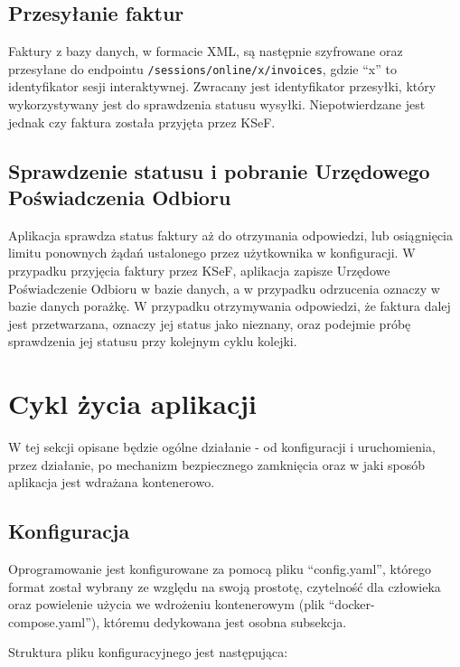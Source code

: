 \subsection{Przesyłanie faktur}
Faktury z bazy danych, w formacie XML, są następnie szyfrowane oraz przesyłane do endpointu \texttt{/sessions/online/x/invoices}, gdzie \enquote{x} to identyfikator sesji interaktywnej. Zwracany jest identyfikator przesyłki, który wykorzystywany jest do sprawdzenia statusu wysyłki. Niepotwierdzane jest jednak czy faktura została przyjęta przez KSeF.

\subsection{Sprawdzenie statusu i pobranie Urzędowego Poświadczenia Odbioru}
Aplikacja sprawdza status faktury aż do otrzymania odpowiedzi, lub osiągnięcia limitu ponownych żądań ustalonego przez użytkownika w konfiguracji. W przypadku przyjęcia faktury przez KSeF, aplikacja zapisze Urzędowe Poświadczenie Odbioru w bazie danych, a w przypadku odrzucenia oznaczy w bazie danych porażkę. W przypadku otrzymywania odpowiedzi, że faktura dalej jest przetwarzana, oznaczy jej status jako nieznany, oraz podejmie próbę sprawdzenia jej statusu przy kolejnym cyklu kolejki.

\section{Cykl życia aplikacji}
W tej sekcji opisane będzie ogólne działanie - od konfiguracji i uruchomienia, przez działanie, po mechanizm bezpiecznego zamknięcia oraz w jaki sposób aplikacja jest wdrażana kontenerowo.

\subsection{Konfiguracja}
Oprogramowanie jest konfigurowane za pomocą pliku \enquote{config.yaml}, którego format został wybrany ze względu na swoją prostotę, czytelność dla człowieka oraz powielenie użycia we wdrożeniu kontenerowym (plik \enquote{docker-compose.yaml}), któremu dedykowana jest osobna subsekcja. 


\noindent Struktura pliku konfiguracyjnego jest następująca:


